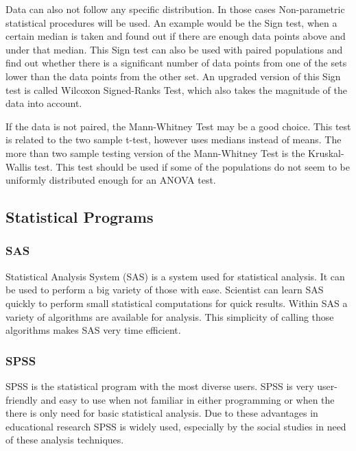 \documentclass[10pt,a4paper]{article}
\begin{document}
	Data can also not follow any specific distribution. In those cases 
	Non-parametric statistical procedures will be used. An example would be the 
	Sign test, when a certain median is taken and found out if there are enough 
	data points above and under that median. This Sign test can also be used 
	with paired populations and find out whether there is a significant number 
	of data points from one of the sets lower than the data points from the 
	other set. An upgraded version of this Sign test is called Wilcoxon 
	Signed-Ranks Test, which also takes the magnitude of the data into 
	account.\cite{heiberger2004statistical}
	
	If the data is not paired, the Mann-Whitney Test may be a good choice. This	
	test is related to the two sample t-test, however uses medians instead of 
	means. The more than two sample testing version of the Mann-Whitney Test is 
	the Kruskal-Wallis test. This test should be used if some of the 
	populations do not seem to be uniformly distributed enough for an ANOVA 
	test.\cite{heiberger2004statistical}
	
	\clearpage
	
	\subsection{Statistical Programs}
	
	\subsubsection{SAS}
	
	Statistical Analysis System (SAS) is a system used for statistical 
	analysis. It can be used to perform a big variety of those with ease. 
	Scientist can learn SAS quickly to perform small statistical computations 
	for quick results. Within SAS a variety of algorithms are available for 
	analysis. This simplicity of calling those algorithms makes SAS very time 
	efficient. \cite{o2013step}
	
	\subsubsection{SPSS}
	
	SPSS is the statistical program with the most diverse users. SPSS is very 
	user-friendly and easy to use when not familiar in either programming or 
	when the there is only need for basic statistical analysis. Due to these 
	advantages in educational research SPSS is widely used, especially by the 
	social studies in need of these analysis techniques. \cite{muijs2010doing}
	
\end{document}
